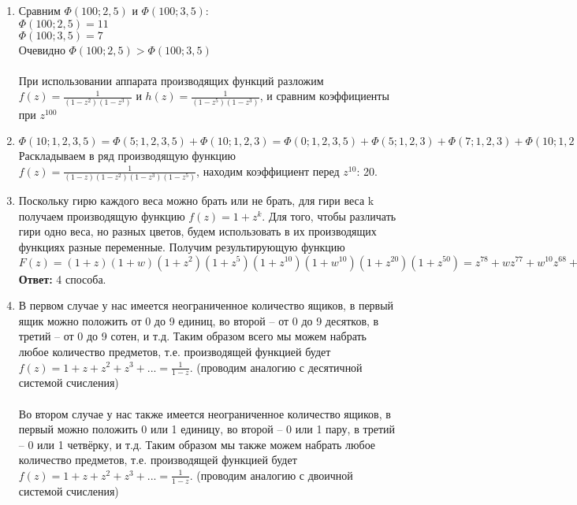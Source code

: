 
\begin{enumerate}
  \item
    Сравним $\Phi(100;2,5)$ и $\Phi(100;3,5)$:\\
    $\Phi(100;2,5) = 11$\\
    $\Phi(100;3,5) = 7$\\
    Очевидно $\Phi(100;2,5) > \Phi(100;3,5)$\\ \\
    При использовании аппарата производящих функций разложим $f(z)=\frac{1}{(1-z^2)(1-z^3)}$ и $h(z) = \frac{1}{(1-z^5)(1-z^3)}$, и сравним коэффициенты при $z^{100}$
    
  \item
    $\Phi(10; 1,2,3,5) = \Phi(5; 1,2,3,5) + \Phi(10; 1,2,3) = \Phi(0; 1,2,3,5) + \Phi(5; 1,2,3) + \Phi(7; 1,2,3) + \Phi(10; 1,2) = 1 + \Phi(2; 1,2,3) + \Phi(5; 1,2) + \Phi(4; 1,2,3) + \Phi(7; 1,2) + \Phi(8; 1,2) + \Phi(10; 1) = 2 + \Phi(2; 1,2) + \Phi(3; 1,2) + \Phi(5; 1) + \Phi(1; 1,2,3) + \Phi(4; 1,2) + \Phi(5; 1,2) + \Phi(7; 1) + \Phi(6; 1,2) + \Phi(8; 1) = 20$\\
    Раскладываем в ряд производящую функцию $f(z) = \frac{1}{(1-z)(1-z^2)(1-z^3)(1-z^5)}$, находим коэффициент перед $z^{10}$: 20.
  
  \item
    Поскольку гирю каждого веса можно брать или не брать, для гири веса k получаем производящую функцию $f(z) = 1 + z^k$. Для того, чтобы различать гири одно веса, но разных цветов, будем использовать в их производящих функциях разные переменные. Получим результирующую функцию $F(z) = (1+z)(1+w)(1+z^2)(1+z^5)(1+z^{10})(1+w^{10})(1+z^{20})(1+z^{50}) = z^{78} + wz^{77} + w^{10}z^{68} + w^{11}z^{67} + ...$ \\
    {\bf Ответ:} 4 способа.
  
  \item
    В первом случае у нас имеется неограниченное количество ящиков, в первый ящик можно положить от 0 до 9 единиц, во второй -- от 0 до 9 десятков, в третий -- от 0 до 9 сотен, и т.д. Таким образом всего мы можем набрать любое количество предметов, т.е. производящей функцией будет $f(z) = 1 + z + z^2 + z^3 + ... = \frac{1}{1-z}$. (проводим аналогию с десятичной системой счисления)\\ \\
    Во втором случае у нас также имеется неограниченное количество ящиков, в первый можно положить 0 или 1 единицу, во второй -- 0 или 1 пару, в третий -- 0 или 1 четвёрку, и т.д. Таким образом мы также можем набрать любое количество предметов, т.е. производящей функцией будет $f(z) = 1 + z + z^2 + z^3 + ... = \frac{1}{1-z}$. (проводим аналогию с двоичной системой счисления)
\end{enumerate}

